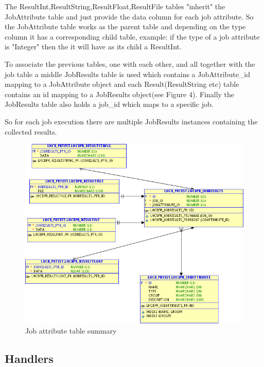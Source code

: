 \documentclass{lhcbnote}
\begin{document}
\vspace{4 mm}

The ResultInt,ResultString,ResultFloat,ResultFile tables "inherit" the JobAttribute table and just provide 
the data column for each job attribute. So the JobAttribute table works as the parent table and depending
on the type column it has a corresponding child table, example: if the type of a job attribute is "Integer"
then the it will have as its child a ResultInt.

To associate the previous tables, one with each other, and all together with the job table a middle
JobResults table is used which contains a JobAttribute\_id mapping to a JobAttribute object and each 
Result(ResultString etc) table contains an id mapping to a JobResults object(see Figure 4). 
Finally the JobResults table also holds a job\_id which maps to a specific job. 

\vspace{6 mm}

So for each job execution there are multiple JobResults instances containing the collected results.

\begin{figure}[ht!]
\centering
\includegraphics[width=170mm]{jobattribute.png}
\caption{Job attribute table summary}
\label{overflow}
\end{figure}


\subsection{Handlers}
\end{document}
